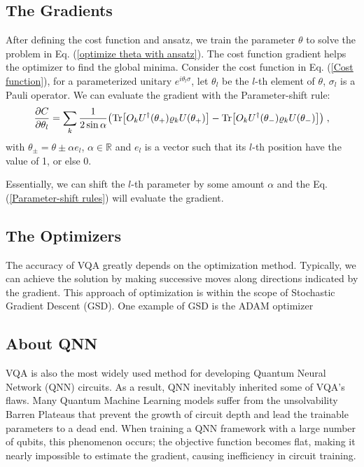 \subsection{The Gradients}
After defining the cost function and ansatz, we train the parameter $\theta$ to solve the problem in Eq. (\ref{optimize theta with ansatz}).
The cost function gradient helps the optimizer to find the global minima. 
Consider the cost function in Eq. (\ref{Cost function}), for a parameterized unitary $e^{i \theta_l \sigma}$, let $\theta_l$ be the $l$-th element of $\theta$, $\sigma_l$ is a Pauli operator. 
We can evaluate the gradient with the Parameter-shift rule:
\begin{equation}
    \frac{\partial C}{\partial\theta_l}
    = \sum_k \frac{1}{2 \sin{\alpha}} 
    \left( 
        \Tr[O_k U^\dagger(\theta_+) \rho_k U(\theta_+)] 
        - \Tr[O_k U^\dagger(\theta_-) \rho_k U(\theta_-)]
    \right) \;,
    \label{Parameter-shift rules}
\end{equation}
with $\theta_{\pm} = \theta \pm \alpha e_l$, $\alpha \in \mathbb{R}$ and $e_l$ is a vector such that its $l$-th position have the value of 1, or else 0.

Essentially, we can shift the $l$-th parameter by some amount $\alpha$ and the Eq. (\ref{Parameter-shift rules}) will evaluate the gradient. 


\subsection{The Optimizers}
The accuracy of VQA greatly depends on the optimization method.
Typically, we can achieve the solution by making successive moves along directions indicated by the gradient.
This approach of optimization is within the scope of Stochastic Gradient Descent (GSD).
One example of GSD is the ADAM optimizer

\subsection{About QNN}
VQA is also the most widely used method for developing Quantum Neural Network (QNN) circuits. 
As a result, QNN inevitably inherited some of VQA's flaws.
Many Quantum Machine Learning models suffer from the unsolvability Barren Plateaus \cite{zhaoReviewQuantumNeural2021} that prevent the growth of circuit depth and lead the trainable parameters to a dead end.
When training a QNN framework with a large number of qubits, this phenomenon occurs; the objective function becomes flat, making it nearly impossible to estimate the gradient, \cite{mccleanBarrenPlateausQuantum2018, zhaoAnalyzingBarrenPlateau2021} causing inefficiency in circuit training. 

